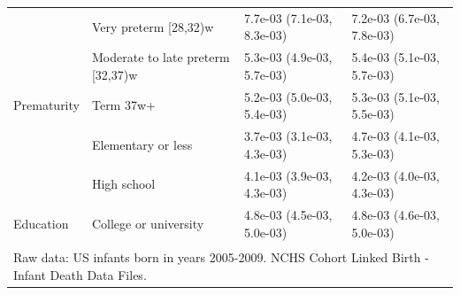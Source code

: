 \documentclass[10pt, twoside, parskip=half]{article}
\begin{document}
\begin{table}[t]
\begin{tabular}{llll}
 & Very preterm [28,32)w & 7.7e-03 (7.1e-03, 8.3e-03) & 7.2e-03 (6.7e-03, 7.8e-03)\\

 & Moderate to late preterm [32,37)w & 5.3e-03 (4.9e-03, 5.7e-03) & 5.4e-03 (5.1e-03, 5.7e-03)\\

\multirow{-4}{*}{\raggedright\arraybackslash \hspace{1em}Prematurity} & Term 37w+ & 5.2e-03 (5.0e-03, 5.4e-03) & 5.3e-03 (5.1e-03, 5.5e-03)\\
\cmidrule{1-4}
 & Elementary or less & 3.7e-03 (3.1e-03, 4.3e-03) & 4.7e-03 (4.1e-03, 5.3e-03)\\

 & High school & 4.1e-03 (3.9e-03, 4.3e-03) & 4.2e-03 (4.0e-03, 4.3e-03)\\

\multirow{-3}{*}{\raggedright\arraybackslash \hspace{1em}Education} & College or university & 4.8e-03 (4.5e-03, 5.0e-03) & 4.8e-03 (4.6e-03, 5.0e-03)\\
\bottomrule
\multicolumn{4}{l}{\textsuperscript{} Raw data: US infants born in years 2005-2009. NCHS Cohort Linked Birth - Infant Death Data Files.}\\
\end{tabular}
\end{table}

\clearpage
\end{document}
